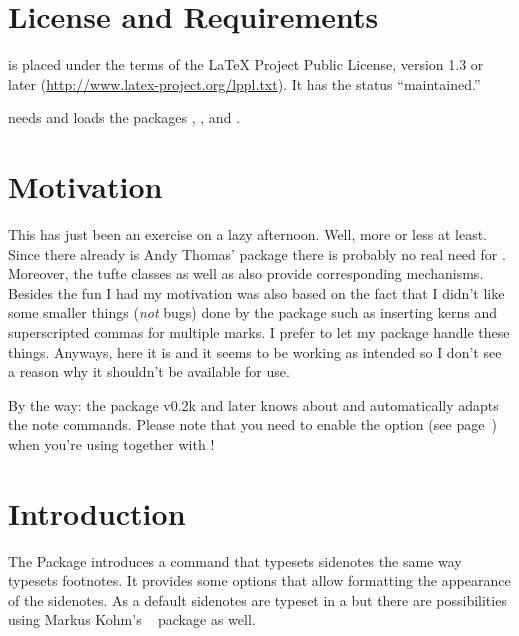 \documentclass[toc=index,toc=bib,mpinclude]{cnpkgdoc}
\makeatletter
\newcommand*\defaultsidenotes{%
  \setsidenotes{
    note-mark-format = \@textsuperscript{\normalfont##1},
    text-format      = \footnotesize
  }}
\makeatother
\begin{document}
\section{License and Requirements}\label{sec:license}
\snotez is placed under the terms of the \LaTeX{} Project Public License,
version 1.3 or later (\url{http://www.latex-project.org/lppl.txt}). It has the
status ``maintained.''

\snotez needs and loads the packages
,
,
 and
.

\section{Motivation}
This has just been an exercise on a lazy
afternoon.
Well, more or less at least. Since there already is Andy Thomas' 
package there is probably
no real need for \snotez. Moreover, the tufte classes
as well as  also provide corresponding
mechanisms. Besides the fun I had my motivation was also based on the fact that
I didn't like some smaller things (\emph{not} bugs) done by the 
package such as inserting kerns and superscripted commas for multiple marks. I
prefer to let my  package handle
these things. Anyways, here it is and it seems to be working as intended so I
don't see a reason why it shouldn't be available for use.

By the way: the  package v0.2k and later knows about \snotez and
automatically adapts the note commands. Please note that you need to enable
the  option (see page~\pageref{key:dblarg}) when you're using
 together with \snotez!

\section{Introduction}
The \snotez Package introduces a  command%
\begingroup\defaultsidenotes
{}
\endgroup
that typesets sidenotes the
same way  typesets footnotes. It provides some options that allow
formatting the appearance of the sidenotes.
As a default sidenotes are typeset in a  but there are possibilities
using Markus Kohm's ~\cite{pkg:marginnote} package as well.
\end{document}
